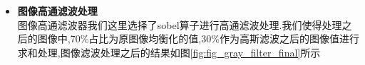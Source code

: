 \documentclass[UTF8,a4paper,10pt]{ctexart}
\begin{document}
\begin{flushleft}
\begin{itemize}
            \hspace{2em}图像规定化处理之后的结果如图\ref{fig:fig_gray_hist_regular_final}所示\\
            \begin{figure}[htbp]
                \centering
                \caption{图像规定化处理}
                \label{fig:fig_gray_hist_regular_final}
            \end{figure}
            \hspace{2em}由于给定参考图像中像素灰度值分布比较少,所以对应的规定化之后的图像明显灰度值缺乏很多.
            \item \textbf{图像高通滤波处理}\\
            \hspace{2em}图像高通滤波器我们这里选择了sobel算子进行高通滤波处理.我们使得处理之后的图像中,70\%占比为原图像均衡化的值,30\%作为高斯滤波之后的图像值进行求和处理,图像滤波处理之后的结果如图\ref{fig:fig_gray_filter_final}所示
            \newpage
            \begin{figure}[htbp]
                \centering
\end{figure}
\end{itemize}
\end{flushleft}
\end{document}
